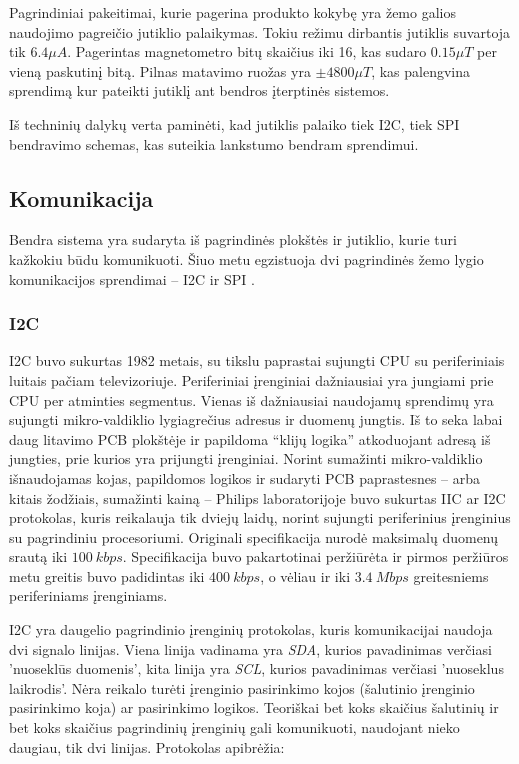 Pagrindiniai pakeitimai, kurie pagerina produkto kokybę yra žemo galios naudojimo pagreičio jutiklio palaikymas.
Tokiu režimu dirbantis jutiklis suvartoja tik $6.4\mu A$.
Pagerintas magnetometro bitų skaičius iki 16, kas sudaro $0.15\mu T$ per vieną paskutinį bitą.
Pilnas matavimo ruožas yra $\pm4800\mu T$, kas palengvina sprendimą kur pateikti jutiklį ant bendros įterptinės sistemos.

Iš techninių dalykų verta paminėti, kad jutiklis palaiko tiek I2C, tiek SPI bendravimo schemas, kas suteikia lankstumo bendram sprendimui.

\subsection{Komunikacija}

Bendra sistema yra sudaryta iš pagrindinės plokštės ir jutiklio, kurie turi kažkokiu būdu komunikuoti. Šiuo metu egzistuoja dvi pagrindinės žemo lygio komunikacijos sprendimai -- I2C ir SPI \cite{Intro92:online}.

\subsubsection{I2C}

I2C buvo sukurtas 1982 metais, su tikslu paprastai sujungti CPU su periferiniais luitais pačiam televizoriuje. 
Periferiniai įrenginiai dažniausiai yra jungiami prie CPU per atminties segmentus.
Vienas iš dažniausiai naudojamų sprendimų yra sujungti mikro-valdiklio lygiagrečius adresus ir duomenų jungtis.
Iš to seka labai daug litavimo PCB plokštėje ir papildoma ``klijų logika'' atkoduojant adresą iš jungties, prie kurios yra prijungti įrenginiai.
Norint sumažinti mikro-valdiklio išnaudojamas kojas, papildomos logikos ir sudaryti PCB paprastesnes -- arba kitais žodžiais, sumažinti kainą -- Philips laboratorijoje buvo sukurtas IIC ar I2C protokolas, kuris reikalauja tik dviejų laidų, norint sujungti periferinius įrenginius su pagrindiniu procesoriumi.
Originali specifikacija nurodė maksimalų duomenų srautą iki $100~kbps$.
Specifikacija buvo pakartotinai peržiūrėta ir pirmos peržiūros metu greitis buvo padidintas iki $400~kbps$, o vėliau ir iki $3.4~Mbps$ greitesniems periferiniams įrenginiams.

I2C yra daugelio pagrindinio įrenginių protokolas, kuris komunikacijai naudoja dvi signalo linijas.
Viena linija vadinama yra \textit{SDA}, kurios pavadinimas verčiasi 'nuoseklūs duomenis', kita linija yra \textit{SCL}, kurios pavadinimas verčiasi 'nuoseklus laikrodis'.
Nėra reikalo turėti įrenginio pasirinkimo kojos (šalutinio įrenginio pasirinkimo koja) ar pasirinkimo logikos.
Teoriškai bet koks skaičius šalutinių ir bet koks skaičius pagrindinių įrenginių gali komunikuoti, naudojant nieko daugiau, tik dvi linijas.
Protokolas apibrėžia:

